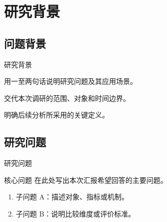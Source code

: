 \section{研究背景}

\subsection{问题背景}

\begin{frame}{研究背景}
  \begin{keypoints}
    \item 用一至两句话说明研究问题及其应用场景。
    \item 交代本次调研的范围、对象和时间边界。
    \item 明确后续分析所采用的关键定义。
  \end{keypoints}
\end{frame}

\subsection{研究问题}

\begin{frame}{研究问题}
  \begin{block}{核心问题}
    在此处写出本次汇报希望回答的主要问题。
  \end{block}
  \vspace{0.6em}
  \begin{enumerate}
    \item \alert{子问题 A}：描述对象、指标或机制。
    \item 子问题 B：说明比较维度或评价标准。
  \end{enumerate}
\end{frame}

